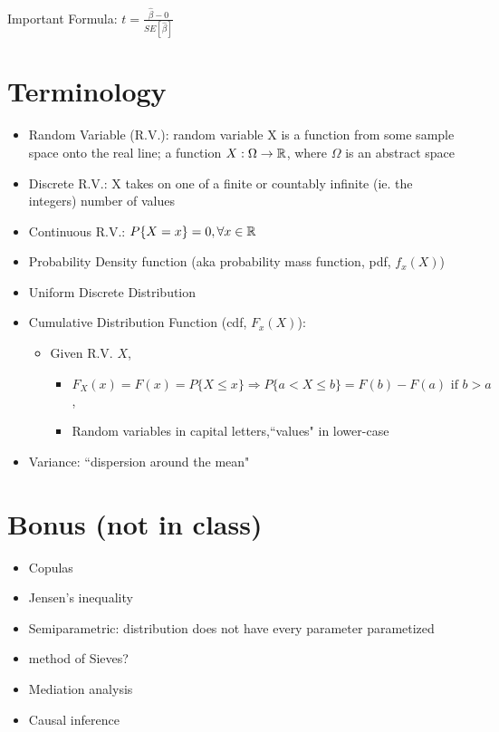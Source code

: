 Important Formula: $t=\frac{\hat \beta -0}{SE[\hat \beta]}$

\section{Terminology}
\begin{itemize}
    \item Random Variable (R.V.): random variable X is a function from some sample space onto the real line; a function $X: \Omega \rightarrow \mathbb{R}$, where $\Omega$ is an abstract space
    \item Discrete R.V.: X takes on one of a finite or countably infinite (ie. the integers) number of values
    \item Continuous R.V.: $P\{X=x\}=0, \forall x \in \mathbb{R}$
    \item Probability Density function (aka probability mass function, pdf, $f_x(X)$)
    \item Uniform Discrete Distribution
    \item Cumulative Distribution Function (cdf, $F_x(X)$): 
    \begin{itemize}
        \item Given R.V. $X$, 
        \begin{itemize}
            \item $F_X(x) = F(x)=P\{X\leq x\}\Rightarrow P\{a<X\leq b\}=F(b)-F(a) \text{ if } b> a$, 
            \item Random variables in capital letters,``values" in lower-case
        \end{itemize}
        
    \end{itemize}
    \item Variance: ``dispersion around the mean"
\end{itemize}


\section{Bonus (not in class)}
\begin{itemize}
    \item Copulas
    \item Jensen's inequality
    \item Semiparametric: distribution does not have every parameter parametized
    \item method of Sieves?
    \item Mediation analysis
    \item Causal inference
\end{itemize}